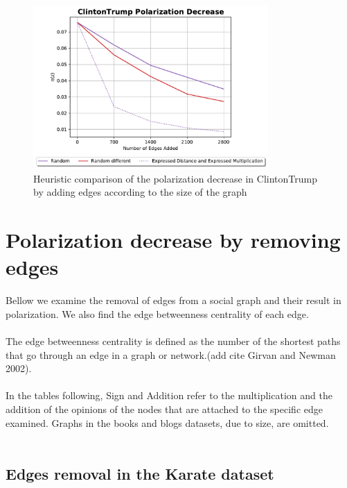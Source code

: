 \begin{figure}[!htbp]
	\centering
	\captionsetup{justification=centering,margin=2cm}
	\includegraphics[width=0.8\textwidth]{Figures/ClintonTrump Polarization Decrease big}
	\caption{Heuristic comparison of the polarization decrease in ClintonTrump by adding edges according to the size of the graph}
	\label{fig:ClintonTrump_big_pol}
\end{figure}

\clearpage


\section{Polarization decrease by removing edges}
\label{sec:polremovingdecrease}
Bellow we examine the removal of edges from a social graph and their result in polarization. We also find the edge betweenness centrality of each edge. 
\\
\\
The edge betweenness centrality is defined as the number of the shortest paths that go through an edge in a graph or network.(add cite Girvan and Newman 2002). 
\\
\\
In the tables following, Sign and Addition refer to the multiplication and the addition of the opinions of the nodes that are attached to the specific edge examined. Graphs in the books and blogs datasets, due to size, are omitted.
\\
\\

\subsection{Edges removal in the Karate dataset}

